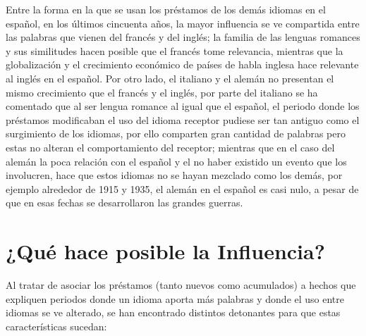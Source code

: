Entre la forma en la que se usan los préstamos de los demás idiomas en el español,  en los últimos cincuenta años, la mayor influencia se ve compartida entre las palabras que vienen del francés y  del inglés;  la familia de las lenguas romances y sus similitudes hacen posible que el francés tome relevancia, mientras que la globalización y el crecimiento económico de países de habla inglesa hace relevante al inglés en el español.   Por otro lado,  el italiano y el alemán  no presentan el mismo crecimiento que el francés y el inglés,  por parte del italiano se ha comentado que al ser lengua romance al igual que el español,  el periodo donde los préstamos modificaban el uso del idioma receptor pudiese ser tan antiguo como el surgimiento de los idiomas,  por ello comparten gran cantidad de palabras pero estas no alteran el comportamiento del receptor; mientras que en el caso del alemán la poca relación con el español y el no haber existido un evento que los involucren,  hace que estos idiomas no se hayan mezclado como los demás,  por ejemplo alrededor de 1915 y 1935,  el alemán en el español es casi nulo, a pesar de que en esas fechas se desarrollaron las grandes guerras.


\newpage

\section{¿Qué hace posible la Influencia?}

Al tratar de asociar los préstamos (tanto nuevos como acumulados) a hechos que expliquen periodos donde un idioma aporta más palabras y donde el uso entre idiomas se ve alterado, se han encontrado distintos detonantes para que estas características sucedan:

